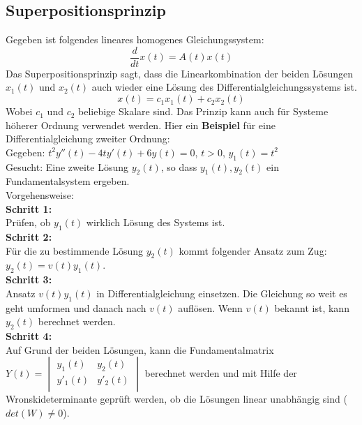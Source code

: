 \subsection{Superpositionsprinzip}
Gegeben ist folgendes lineares homogenes Gleichungssystem:
\begin{equation*}
\frac{d}{dt}x(t) = A(t)x(t)
\end{equation*}
Das Superpositionsprinzip sagt, dass die Linearkombination der beiden Lösungen $x_1(t)$ und $x_2(t)$ auch wieder eine Lösung des Differentialgleichungssystems ist. 
\begin{equation*}
	x(t) = c_1 x_1(t) + c_2 x_2(t)
\end{equation*}
Wobei $c_1$ und $c_2$ beliebige Skalare sind. 
Das Prinzip kann auch für Systeme höherer Ordnung verwendet werden. Hier ein \textbf{Beispiel} für eine Differentialgleichung zweiter Ordnung: \\
Gegeben: $t^2y''(t)-4ty'(t)+6y(t)=0$, $t>0$, $y_1(t)=t^2$\\
Gesucht: Eine zweite Lösung $y_2(t)$, so dass ${y_1(t),y_2(t)}$ ein Fundamentalsystem ergeben. \\
Vorgehensweise: \\
\textbf{Schritt 1:}\\
Prüfen, ob $y_1(t)$ wirklich Lösung des Systems ist. \\
\textbf{Schritt 2:}\\
Für die zu bestimmende Lösung $y_2(t)$ kommt folgender Ansatz zum Zug: $y_2(t) = v(t)y_1(t)$.\\
\textbf{Schritt 3:}\\
Ansatz $v(t)y_1(t)$ in Differentialgleichung einsetzen. Die Gleichung so weit es geht umformen und danach nach $v(t)$ auflösen. Wenn $v(t)$ bekannt ist, kann $y_2(t)$ berechnet werden. \\
\textbf{Schritt 4:}\\
Auf Grund der beiden Lösungen, kann die Fundamentalmatrix $Y(t) =
\begin{vmatrix} 
	        y_{1}(t) & y_{2}(t)\\ 
	        y'_{1}(t) & y'_{2}(t)\\   
\end{vmatrix} $ berechnet werden und mit Hilfe der Wronskideterminante geprüft werden, ob die Lösungen linear unabhängig sind ($det(W) \neq 0$). 
